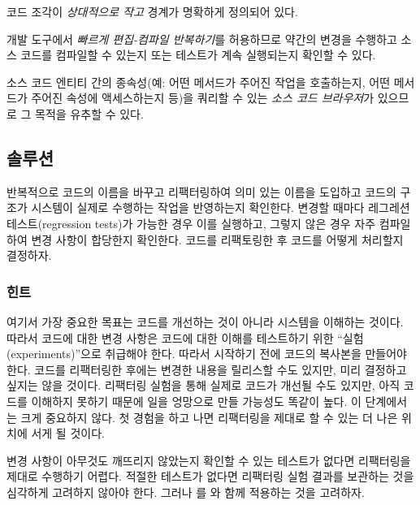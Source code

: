 \documentclass[a4paper,10pt,twoside]{book}
\begin{document}
\begin{bulletlist}
\item 코드 조각이 \emph{상대적으로 작고} 경계가 명확하게 정의되어 있다.

\item 개발 도구에서 \emph{빠르게 편집-컴파일 반복하기}를 허용하므로 약간의 변경을 수행하고 소스 코드를 컴파일할 수 있는지 또는 테스트가 계속 실행되는지 확인할 수 있다.

\item 소스 코드 엔티티 간의 종속성(예: 어떤 메서드가 주어진 작업을 호출하는지, 어떤 메서드가 주어진 속성에 액세스하는지 등)을 쿼리할 수 있는 \emph{소스 코드 브라우저}가 있으므로 그 목적을 유추할 수 있다.
\end{bulletlist}

\subsection*{솔루션}

반복적으로 코드의 이름을 바꾸고 리팩터링하여 의미 있는 이름을 도입하고 코드의 구조가 시스템이 실제로 수행하는 작업을 반영하는지 확인한다. 변경할 때마다 레그레션 테스트(regression tests)가 가능한 경우 이를 실행하고, 그렇지 않은 경우 자주 컴파일하여 변경 사항이 합당한지 확인한다. 코드를 리팩토링한 후 코드를 어떻게 처리할지 결정하자.

\subsubsection*{힌트}

여기서 가장 중요한 목표는 코드를 개선하는 것이 아니라 시스템을 이해하는 것이다. 따라서 코드에 대한 변경 사항은 코드에 대한 이해를 테스트하기 위한 ``실험(experiments)''으로 취급해야 한다. 따라서 시작하기 전에 코드의 복사본을 만들어야 한다. 코드를 리팩터링한 후에는 변경한 내용을 릴리스할 수도 있지만, 미리 결정하고 싶지는 않을 것이다. 리팩터링 실험을 통해 실제로 코드가 개선될 수도 있지만, 아직 코드를 이해하지 못하기 때문에 일을 엉망으로 만들 가능성도 똑같이 높다. 이 단계에서는 크게 중요하지 않다. 첫 경험을 하고 나면 리팩터링을 제대로 할 수 있는 더 나은 위치에 서게 될 것이다. 

변경 사항이 아무것도 깨뜨리지 않았는지 확인할 수 있는 테스트가 없다면 리팩터링을 제대로 수행하기 어렵다. 적절한 테스트가 없다면 리팩터링 실험 결과를 보관하는 것을 심각하게 고려하지 않아야 한다. 그러나 를 와 함께 적용하는 것을 고려하자. 
\end{document}
